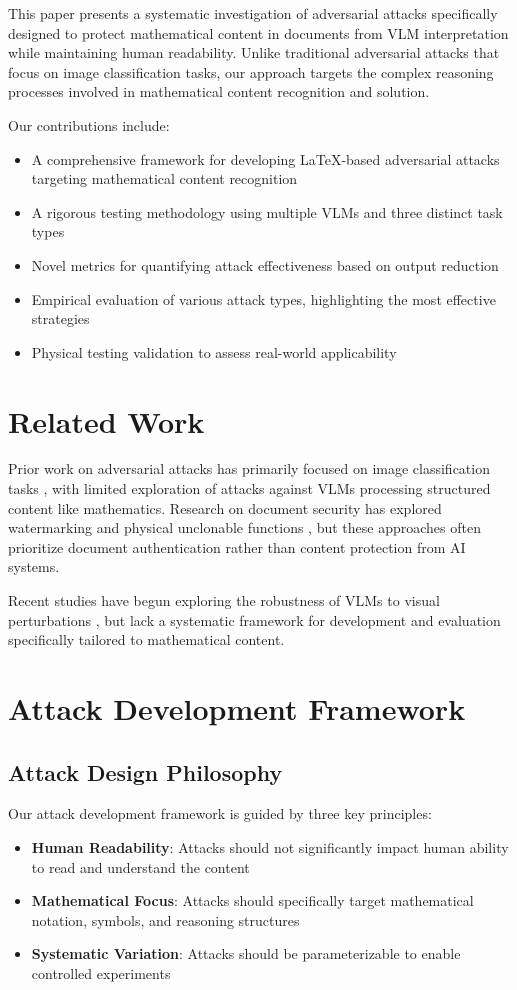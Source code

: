 \documentclass[conference]{IEEEtran}
\begin{document}
This paper presents a systematic investigation of adversarial attacks specifically designed to protect mathematical content in documents from VLM interpretation while maintaining human readability. Unlike traditional adversarial attacks that focus on image classification tasks, our approach targets the complex reasoning processes involved in mathematical content recognition and solution.

Our contributions include:
\begin{itemize}
    \item A comprehensive framework for developing LaTeX-based adversarial attacks targeting mathematical content recognition
    \item A rigorous testing methodology using multiple VLMs and three distinct task types
    \item Novel metrics for quantifying attack effectiveness based on output reduction
    \item Empirical evaluation of various attack types, highlighting the most effective strategies
    \item Physical testing validation to assess real-world applicability
\end{itemize}

\section{Related Work}
Prior work on adversarial attacks has primarily focused on image classification tasks \cite{example1, example2}, with limited exploration of attacks against VLMs processing structured content like mathematics. Research on document security has explored watermarking \cite{example3} and physical unclonable functions \cite{example4}, but these approaches often prioritize document authentication rather than content protection from AI systems.

Recent studies have begun exploring the robustness of VLMs to visual perturbations \cite{example5, example6}, but lack a systematic framework for development and evaluation specifically tailored to mathematical content.

\section{Attack Development Framework}
\subsection{Attack Design Philosophy}
Our attack development framework is guided by three key principles:
\begin{itemize}
    \item \textbf{Human Readability}: Attacks should not significantly impact human ability to read and understand the content
    \item \textbf{Mathematical Focus}: Attacks should specifically target mathematical notation, symbols, and reasoning structures
    \item \textbf{Systematic Variation}: Attacks should be parameterizable to enable controlled experiments
\end{itemize}
\end{document}
